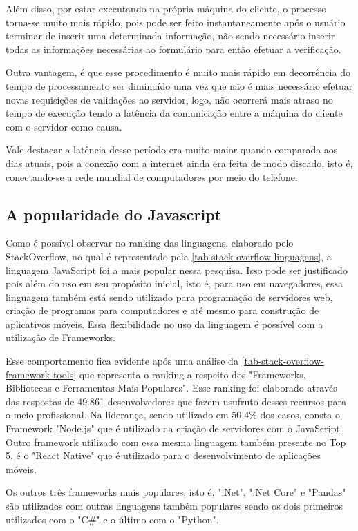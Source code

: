 Além disso, por estar executando na própria máquina do cliente, o processo torna-se muito mais rápido, pois pode ser feito instantaneamente após o usuário terminar de inserir uma determinada informação, não sendo necessário inserir todas as informações necessárias ao formulário para então efetuar a verificação.

Outra vantagem, é que esse procedimento é muito mais rápido em decorrência do tempo de processamento ser diminuído uma vez que não é mais necessário efetuar novas requisições de validações ao servidor, logo, não ocorrerá mais atraso no tempo de execução tendo a latência da comunicação entre a máquina do cliente com o servidor como causa.

Vale destacar a latência desse período era muito maior quando comparada aos dias atuais, pois a conexão com a internet ainda era feita de modo discado, isto é, conectando-se a rede mundial de computadores por meio do telefone.

\subsection{A popularidade do Javascript}

Como é possível observar no ranking das linguagens, elaborado pelo StackOverflow, no qual é representado pela \autoref{tab-stack-overflow-linguagens}, a linguagem JavaScript foi a mais popular nessa pesquisa. Isso pode ser justificado pois além do uso em seu propósito inicial, isto é, para uso em navegadores, essa linguagem também está sendo utilizado para programação de servidores web, criação de programas para computadores e até mesmo para construção de aplicativos móveis. Essa flexibilidade no uso da linguagem é possível com a utilização de Frameworks.

Esse comportamento fica evidente após uma análise da \autoref{tab-stack-overflow-framework-tools} que representa o ranking a respeito dos "Frameworks, Bibliotecas e Ferramentas Mais Populares". Esse ranking foi elaborado através das respostas de 49.861 desenvolvedores que fazem usufruto desses recursos para o meio profissional. Na liderança, sendo utilizado em 50,4\% dos casos, consta o Framework "Node.js" que é utilizado na criação de servidores com o JavaScript. Outro framework utilizado com essa mesma linguagem também presente no Top 5, é o "React Native" que é utilizado para o desenvolvimento de aplicações móveis.

Os outros três frameworks mais populares, isto é, ".Net", ".Net Core" e "Pandas" são utilizados com outras linguagens também populares sendo os dois primeiros utilizados com o "C\#" e o último com o "Python".

